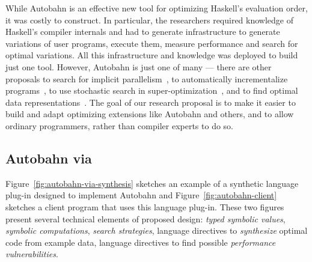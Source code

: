 While Autobahn is an effective new tool for optimizing Haskell's evaluation
order, it was costly to construct.  In particular, the researchers
required knowledge of Haskell's compiler internals and had to generate
infrastructure to generate variations of user programs, execute them,
measure performance and search for optimal variations.  All this
infrastructure and knowledge was deployed to build just one tool.  
However, Autobahn is just one of many --- there are other proposals to
search for implicit parallelism~\cite{?}, to automatically incrementalize
programs~\cite{type-directed-incrementalization}, to use stochastic search
in super-optimization~\cite{?,?,?}, and to find optimal data 
representations~\cite{?}.  The goal of our research proposal
is to make it easier to build and adapt optimizing extensions like
Autobahn and others, and to allow ordinary programmers, rather than 
compiler experts to do so.  

\subsection{Autobahn via \rsynth}
\label{sec:autobahn}

Figure~\ref{fig:autobahn-via-synthesis} sketches an example of a synthetic 
language plug-in designed to implement Autobahn and Figure~\ref{fig:autobahn-client} sketches a client program that uses this language plug-in.  These two 
figures present
several technical elements of proposed design:  \emph{typed symbolic values}, 
\emph{symbolic computations}, \emph{search strategies}, language directives to
\emph{synthesize} optimal code from example data, language directives to
find possible \emph{performance vulnerabilities}. 


